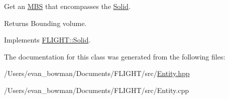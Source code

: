 Get an \hyperlink{class_f_l_i_g_h_t_1_1_m_b_s}{M\+BS} that encompasses the \hyperlink{class_f_l_i_g_h_t_1_1_solid}{Solid}. 

\begin{DoxyReturn}{Returns}
Bounding volume. 
\end{DoxyReturn}


Implements \hyperlink{class_f_l_i_g_h_t_1_1_solid_ad96c0c336a3d32fcd4dee3c35043c862}{F\+L\+I\+G\+H\+T\+::\+Solid}.



The documentation for this class was generated from the following files\+:\begin{DoxyCompactItemize}
\item 
/\+Users/evan\+\_\+bowman/\+Documents/\+F\+L\+I\+G\+H\+T/src/\hyperlink{_entity_8hpp}{Entity.\+hpp}\item 
/\+Users/evan\+\_\+bowman/\+Documents/\+F\+L\+I\+G\+H\+T/src/Entity.\+cpp\end{DoxyCompactItemize}
